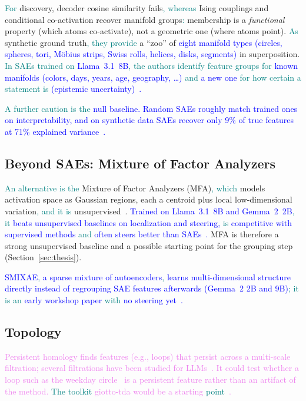 \documentclass[11pt,a4paper]{article}
\newcommand{\fromextra}[1]{\textcolor{blue}{#1}}
\newcommand{\fromold}[1]{\textcolor{violet}{#1}}
\newcommand{\fromclaude}[1]{\textcolor{orange!85!black}{#1}}
\newcommand{\fromprose}[1]{\textcolor{teal}{#1}}
\newcommand{\fromextra}[1]{#1}
\newcommand{\fromold}[1]{#1}
\newcommand{\fromclaude}[1]{#1}
\newcommand{\fromprose}[1]{#1}
\begin{document}
\fromprose{For} discovery, decoder cosine similarity fails\fromprose{, whereas} Ising couplings and conditional co-activation recover manifold groups\fromprose{:} membership is a \emph{functional} property (which atoms co-activate), not a geometric one (where atoms point).
\fromprose{As} synthetic ground truth\fromprose{, they provide} a \enquote{zoo} of \fromextra{eight manifold types (circles, spheres, tori, Möbius strips, Swiss rolls, helices, disks, segments)} in superposition.
\fromextra{\fromprose{In SAEs trained on} Llama~3.1~8B\fromprose{, the authors identify feature groups for} known manifolds (colors, days, years, age, geography, \dots) \fromprose{and} a new one \fromprose{for how certain a statement is} (epistemic uncertainty)~\cite{bhalla2026saemanifolds}.}

\fromextra{\fromprose{A further caution is the} null baseline. Random SAEs roughly match trained ones on interpretability, and on synthetic data SAEs recover only 9\% of true features at 71\% explained variance~\cite{korznikov2026sanity}.}

\subsection{Beyond SAEs: Mixture of Factor Analyzers}
\fromprose{An alternative is the} Mixture of Factor Analyzers (MFA)\fromprose{, which} models activation space as Gaussian regions, each a centroid plus local low-dimensional variation\fromprose{, and it is} unsupervised~\cite{shafran2026regions}.
\fromextra{Trained on Llama~3.1~8B and Gemma~2~2B\fromprose{, it} beats unsupervised baselines on localization and steering, \fromprose{is} competitive with supervised methods \fromprose{and} often steers better than SAEs~\cite{shafran2026regions}.}
\fromclaude{MFA is therefore a strong unsupervised baseline and a possible starting point for the grouping step (Section~\ref{sec:thesis}).}

\fromextra{SMIXAE\fromprose{,} a sparse mixture of autoencoders\fromprose{,} learns multi-dimensional structure directly instead of regrouping SAE features afterwards (Gemma~2 2B and 9B)\fromprose{; it is an} early workshop paper \fromprose{with} no steering yet~\cite{francel2026smixae}.}

\subsection{Topology}
\fromold{Persistent homology finds features (e.g., loops) that persist across a multi-scale filtration; several filtrations have been studied for LLMs~\cite{gardinazzi2024persistent}.}
\fromold{It could test whether a loop such as the weekday circle~\cite{engels2025notall} is a persistent feature rather than an artifact of the method.}
\fromold{\fromprose{The toolkit} giotto-tda would be a starting \fromprose{point}~\cite{tauzin2021giotto}.}
\end{document}
